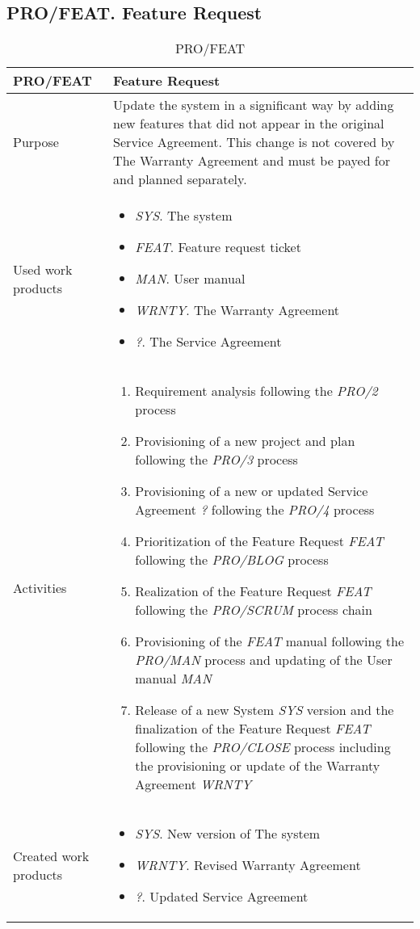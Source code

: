\subsection{PRO/FEAT. Feature Request}
\begin{table}[]
\begin{tabular}{l|p{}}
\hline
\textbf{PRO/FEAT}        & \textbf{Feature Request} \\ \hline
Purpose & Update the system in a significant way by adding new features that did not appear in the original Service Agreement. This change is not covered by The Warranty Agreement and must be payed for and planned separately. \\ \hline
Used work products    &      
\begin{itemize}
    \item \textit{SYS}. The system
    \item \textit{FEAT}. Feature request ticket
    \item \textit{MAN}. User manual
    \item \textit{WRNTY}. The Warranty Agreement
    \item \textit{?}. The Service Agreement
\end{itemize}
\\ \hline
Activities            &   
\begin{enumerate}
    \item Requirement analysis following the \textit{PRO/2} process
    \item Provisioning of a new project and plan following the \textit{PRO/3} process
    \item Provisioning of a new or updated Service Agreement \textit{?} following the \textit{PRO/4} process
    \item Prioritization of the Feature Request \textit{FEAT} following the \textit{PRO/BLOG} process
    \item Realization of the Feature Request \textit{FEAT} following the \textit{PRO/SCRUM} process chain
    \item Provisioning of the \textit{FEAT} manual following the \textit{PRO/MAN} process and updating of the User manual \textit{MAN}
    \item Release of a new System \textit{SYS} version and the finalization of the Feature Request \textit{FEAT} following the \textit{PRO/CLOSE} process including the provisioning or update of the Warranty Agreement \textit{WRNTY}
\end{enumerate}
\\ \hline
Created work products &     
\begin{itemize}
    \item \textit{SYS}. New version of The system
    \item \textit{WRNTY}. Revised Warranty Agreement
    \item \textit{?}. Updated Service Agreement
\end{itemize}
\end{tabular}
\caption{PRO/FEAT}
\label{pro/FEAT}
\end{table}



